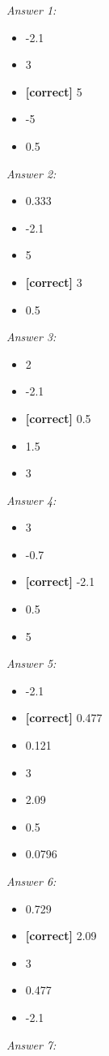 \documentclass[11pt]{article}
\begin{document}
\begin{enumerate}[leftmargin=*,label=\textbf{Question \arabic*.}]
\textit{Answer 1:}
\begin{itemize}
  \item -2.1
  \item 3
  \item \textbf{[correct]} 5
  \item -5
  \item 0.5
\end{itemize}
\textit{Answer 2:}
\begin{itemize}
  \item 0.333
  \item -2.1
  \item 5
  \item \textbf{[correct]} 3
  \item 0.5
\end{itemize}
\textit{Answer 3:}
\begin{itemize}
  \item 2
  \item -2.1
  \item \textbf{[correct]} 0.5
  \item 1.5
  \item 3
\end{itemize}
\textit{Answer 4:}
\begin{itemize}
  \item 3
  \item -0.7
  \item \textbf{[correct]} -2.1
  \item 0.5
  \item 5
\end{itemize}
\textit{Answer 5:}
\begin{itemize}
  \item -2.1
  \item \textbf{[correct]} 0.477
  \item 0.121
  \item 3
  \item 2.09
  \item 0.5
  \item 0.0796
\end{itemize}
\textit{Answer 6:}
\begin{itemize}
  \item 0.729
  \item \textbf{[correct]} 2.09
  \item 3
  \item 0.477
  \item -2.1
\end{itemize}
\textit{Answer 7:}
\begin{itemize}

\end{itemize}
\end{enumerate}
\end{document}
